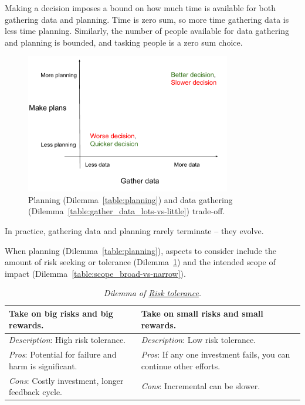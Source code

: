Making a decision imposes a bound on how much time is available for both gathering data and planning. Time is zero sum, so more time gathering data is less time planning. Similarly, the number of people available for data gathering and planning is bounded, and tasking people is a zero sum choice.

\begin{figure}[H] %
    \centering
    \includegraphics[width=0.8\textwidth]{images/planning_and_data_gathering.pdf}
    \caption{Planning (Dilemma~\ref{table:planning}) and data gathering (Dilemma~\ref{table:gather_data_lots-vs-little}) trade-off.}
    \label{fig:pareto_frontier}
\end{figure}

In practice, gathering data and planning rarely terminate -- they evolve.




When planning (Dilemma~\ref{table:planning}), aspects to consider include
the amount of risk seeking or tolerance (Dilemma~\ref{table:risk})
and
the intended scope of impact  (Dilemma~\ref{table:scope_broad-vs-narrow}).

\begin{center}
\begin{table}[H] %
\begin{tabular}{ | m{\dilemmatablewidth}| m{\dilemmatablewidth} | } 
  \hline
  \textbf{Take on big risks and big rewards.} & 
  \textbf{Take on small risks and small rewards.} \\ 
  \hline
  \textit{Description}: High risk tolerance. &
  \textit{Description}: Low risk tolerance. \\
  \hline
  \textit{Pros}: Potential for failure and harm is significant. &
  \textit{Pros}: If any one investment fails, you can continue other efforts. \\
  \hline
  \textit{Cons}: Costly investment, longer feedback cycle. & 
  \textit{Cons}: Incremental can be slower. \\
  \hline
\end{tabular}
\caption{\textit{Dilemma of \href{https://en.wikipedia.org/wiki/Risk_assessment}{Risk tolerance}.} 
}
\label{table:risk}
\end{table}
\end{center}

